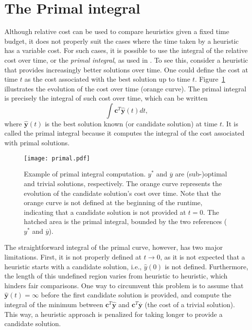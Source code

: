 \section{The Primal integral}\label{sec:primal-integral}


Although relative cost can be used to compare heuristics given a fixed time budget, it does not properly suit the cases where the time taken by a heuristic has a variable cost.
For such cases, it is possible to use the integral of the relative cost over time, or the \emph{primal integral}, as used in .
To see this, consider a heuristic that provides increasingly better solutions over time.
One could define the cost at time $t$ as the cost associated with the best solution up to time $t$.
Figure~\ref{fig:primal-curve} illustrates the evolution of the cost over time (orange curve).
The primal integral is precisely the integral of such cost over time, which can be written \[
    \int \bm{c}^T \hat{\bm{y}}(t) dt
,\] where $\hat{\bm{y}}(t)$ is the best solution known (or candidate solution) at time $t$.
It is called the primal integral because it computes the integral of the cost associated with primal solutions.

\begin{figure}[h]
    \centering
    \texttt{[image: primal.pdf]}
    \caption{Example of primal integral computation. $y^*$ and $\overline{y}$ are (sub-)optimal and trivial solutions, respectively. The orange curve represents the evolution of the candidate solution's cost over time. Note that the orange curve is not defined at the beginning of the runtime, indicating that a candidate solution is not provided at $t=0$. The hatched area is the primal integral, bounded by the two references ($y^*$ and $\overline{y}$).}
    \label{fig:primal-curve}
\end{figure}

The straightforward integral of the primal curve, however, has two major limitations.
First, it is not properly defined at $t \to 0$, as it is not expected that a heuristic starts with a candidate solution, i.e., $\hat{y}(0)$ is not defined.
Furthermore, the length of this undefined region varies from heuristic to heuristic, which hinders fair comparisons.
One way to circumvent this problem is to assume that $\hat{\bm{y}}(t) = \infty$ before the first candidate solution is provided, and compute the integral of the minimum between $\bm{c}^T \hat{\bm{y}}$ and $\bm{c}^T\overline{\bm{y}}$ (the cost of a trivial solution).
This way, a heuristic approach is penalized for taking longer to provide a candidate solution.

